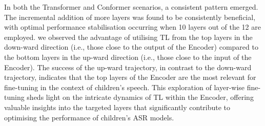 In both the Transformer and Conformer scenarios, a consistent pattern emerged. The incremental addition of more layers was found to be consistently beneficial, with optimal performance stabilisation occurring when 10 layers out of the 12 are employed. we observed the advantage of utilising \ac{TL} from the top layers in the down-ward direction (i.e., those close to the output of the Encoder) compared to the bottom layers in the up-ward direction (i.e., those close to the input of the Encoder). The success of the up-ward trajectory, in contrast to the down-ward trajectory, indicates that the top layers of the Encoder are the most relevant for fine-tuning in the context of children's speech. This exploration of layer-wise fine-tuning sheds light on the intricate dynamics of \ac{TL} within the Encoder, offering valuable insights into the targeted layers that significantly contribute to optimising the performance of children's \ac{ASR} models. 
